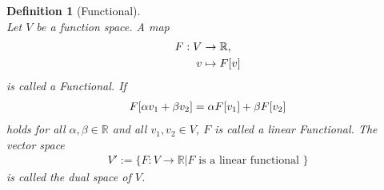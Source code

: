 \documentclass[a4paper,11pt]{article}
\numberwithin{equation}{section}
\newtheorem{definition}{Definition}[section]
\newcommand{\theoremNewline}{\hspace{1mm}\\}
\newcommand{\theoremEndLine}{\hspace{1mm}}
\newcommand{\komma}{\text{,}}
\newcommand{\R}{\mathbb{R}}
\begin{document}
      \begin{definition}[Functional]\theoremNewline
        \label{definition::abstract_concept::functional}
        Let $V$ be a function space. A map
        \begin{align}
          F: V &\rightarrow \R\komma
            \notag\\
          v &\mapsto F[v]
        \end{align}
        is called a \textnormal{Functional}. If
        \begin{align}
          F[\alpha v_1 + \beta v_2] = \alpha F[v_1] + \beta F[v_2]
            \notag
        \end{align}
        holds for all ${\alpha,\beta \in \R}$ and all ${v_1,v_2\in V}$, $F$ is called a \textnormal{linear Functional}.
        The vector space
        \begin{align}
          V' := \big\{ F : V \rightarrow \R \big| F \text{ is a linear functional } \big\}
        \end{align}
        is called the dual space of $V$.
      \end{definition}\theoremEndLine
\end{document}
